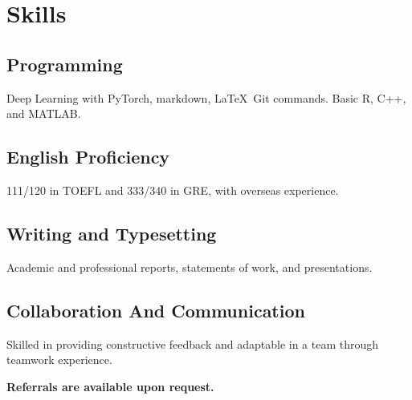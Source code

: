 \documentclass[a4paper]{article}
\begin{document}
\section{Skills}

\subsection{Programming}
Deep Learning with PyTorch, markdown, \LaTeX\, Git commands. Basic R, C++, and MATLAB.

\subsection{English Proficiency}
111/120 in TOEFL and 333/340 in GRE, with overseas experience.

\subsection{Writing and Typesetting}
Academic and professional reports, statements of work, and presentations.

\subsection{Collaboration And Communication}
Skilled in providing constructive feedback and adaptable in a team through teamwork experience.

\vfill
\begin{center}
    \textbf{Referrals are available upon request.}
\end{center}
\end{document}
